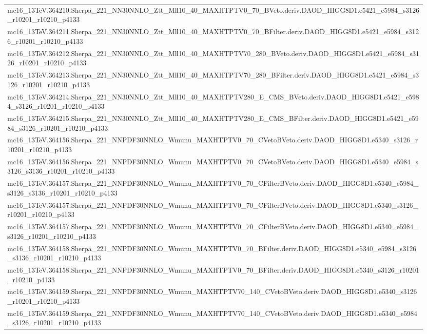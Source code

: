 \begin{adjustwidth}{-3em}{-3em}
\begin{longtable}{l}
mc16\_13TeV.364210.Sherpa\_221\_NN30NNLO\_Ztt\_Mll10\_40\_MAXHTPTV0\_70\_BVeto.deriv.DAOD\_HIGG8D1.e5421\_e5984\_s3126\_r10201\_r10210\_p4133 \\
mc16\_13TeV.364211.Sherpa\_221\_NN30NNLO\_Ztt\_Mll10\_40\_MAXHTPTV0\_70\_BFilter.deriv.DAOD\_HIGG8D1.e5421\_e5984\_s3126\_r10201\_r10210\_p4133 \\
mc16\_13TeV.364212.Sherpa\_221\_NN30NNLO\_Ztt\_Mll10\_40\_MAXHTPTV70\_280\_BVeto.deriv.DAOD\_HIGG8D1.e5421\_e5984\_s3126\_r10201\_r10210\_p4133 \\
mc16\_13TeV.364213.Sherpa\_221\_NN30NNLO\_Ztt\_Mll10\_40\_MAXHTPTV70\_280\_BFilter.deriv.DAOD\_HIGG8D1.e5421\_e5984\_s3126\_r10201\_r10210\_p4133 \\
mc16\_13TeV.364214.Sherpa\_221\_NN30NNLO\_Ztt\_Mll10\_40\_MAXHTPTV280\_E\_CMS\_BVeto.deriv.DAOD\_HIGG8D1.e5421\_e5984\_s3126\_r10201\_r10210\_p4133 \\
mc16\_13TeV.364215.Sherpa\_221\_NN30NNLO\_Ztt\_Mll10\_40\_MAXHTPTV280\_E\_CMS\_BFilter.deriv.DAOD\_HIGG8D1.e5421\_e5984\_s3126\_r10201\_r10210\_p4133 \\
mc16\_13TeV.364156.Sherpa\_221\_NNPDF30NNLO\_Wmunu\_MAXHTPTV0\_70\_CVetoBVeto.deriv.DAOD\_HIGG8D1.e5340\_s3126\_r10201\_r10210\_p4133 \\
mc16\_13TeV.364156.Sherpa\_221\_NNPDF30NNLO\_Wmunu\_MAXHTPTV0\_70\_CVetoBVeto.deriv.DAOD\_HIGG8D1.e5340\_e5984\_s3126\_s3136\_r10201\_r10210\_p4133 \\
mc16\_13TeV.364157.Sherpa\_221\_NNPDF30NNLO\_Wmunu\_MAXHTPTV0\_70\_CFilterBVeto.deriv.DAOD\_HIGG8D1.e5340\_e5984\_s3126\_s3136\_r10201\_r10210\_p4133 \\
mc16\_13TeV.364157.Sherpa\_221\_NNPDF30NNLO\_Wmunu\_MAXHTPTV0\_70\_CFilterBVeto.deriv.DAOD\_HIGG8D1.e5340\_s3126\_r10201\_r10210\_p4133 \\
mc16\_13TeV.364157.Sherpa\_221\_NNPDF30NNLO\_Wmunu\_MAXHTPTV0\_70\_CFilterBVeto.deriv.DAOD\_HIGG8D1.e5340\_e5984\_s3126\_r10201\_r10210\_p4133 \\
mc16\_13TeV.364158.Sherpa\_221\_NNPDF30NNLO\_Wmunu\_MAXHTPTV0\_70\_BFilter.deriv.DAOD\_HIGG8D1.e5340\_e5984\_s3126\_s3136\_r10201\_r10210\_p4133 \\
mc16\_13TeV.364158.Sherpa\_221\_NNPDF30NNLO\_Wmunu\_MAXHTPTV0\_70\_BFilter.deriv.DAOD\_HIGG8D1.e5340\_s3126\_r10201\_r10210\_p4133 \\
mc16\_13TeV.364159.Sherpa\_221\_NNPDF30NNLO\_Wmunu\_MAXHTPTV70\_140\_CVetoBVeto.deriv.DAOD\_HIGG8D1.e5340\_s3126\_r10201\_r10210\_p4133 \\
mc16\_13TeV.364159.Sherpa\_221\_NNPDF30NNLO\_Wmunu\_MAXHTPTV70\_140\_CVetoBVeto.deriv.DAOD\_HIGG8D1.e5340\_e5984\_s3126\_r10201\_r10210\_p4133 \\

\end{longtable}
\end{adjustwidth}
